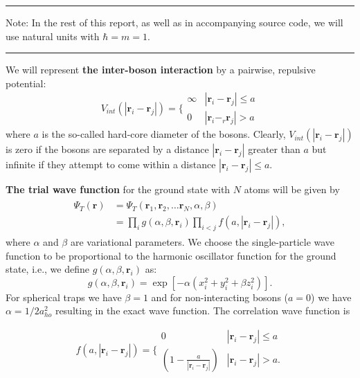 \documentclass[a4paper, 11pt]{article}
\begin{document}
\begin{multicols}{2}
\vspace{0.3cm}\hrule\vspace{0.2cm}
Note: In the rest of this report, as well as in accompanying source code, we
will use natural units with $\hbar = m = 1$.
\vspace{0.2cm}\hrule\vspace{0.3cm}

We will represent \textbf{the inter-boson interaction} by a pairwise,
repulsive potential:
\begin{equation}
    V_{int}(|\mathbf{r}_i-\mathbf{r}_j|) =  \Bigg\{
        \begin{array}{ll}
            \infty & {|\mathbf{r}_i-\mathbf{r}_j|} \leq {a}\\
            0 & {|\mathbf{r}_i-_r\mathbf{r}_j|} > {a}
        \end{array}
\end{equation}
where $a$ is the so-called hard-core diameter of the bosons.
Clearly, $V_{int}(|\mathbf{r}_i-\mathbf{r}_j|)$ is zero if the bosons are
separated by a distance $|\mathbf{r}_i-\mathbf{r}_j|$ greater than $a$ but
infinite if they attempt to come within a distance $|\mathbf{r}_i-\mathbf{r}_j| \leq a$.

\textbf{The trial wave function} for the ground state with $N$ atoms will be given by
\begin{align}
    \begin{split}
    \Psi_T(\mathbf{r})&=\Psi_T(\mathbf{r}_1, \mathbf{r}_2, \dots
    \mathbf{r}_N,\alpha,\beta)\\
    &=\prod_i g(\alpha,\beta,\mathbf{r}_i)\prod_{i<j}f(a,|\mathbf{r}_i-\mathbf{r}_j|),
    \end{split}
    \label{eq:trialwf}
\end{align}
where $\alpha$ and $\beta$ are variational parameters. We choose the
single-particle wave function to be proportional to the harmonic
oscillator function for the ground state, i.e., we define $g(\alpha,\beta,\mathbf{r}_i)$ as:
\begin{equation}
    g(\alpha,\beta,\mathbf{r}_i)= \exp[-\alpha(x_i^2+y_i^2+\beta z_i^2)].
\end{equation}
For spherical traps we have $\beta = 1$ and for non-interacting
bosons ($a=0$) we have $\alpha = 1/2a_{ho}^2$ resulting in the exact wave
function. The correlation wave function is

\begin{equation}
    f(a,|\mathbf{r}_i-\mathbf{r}_j|)=\Bigg\{
        \begin{array}{ll}
            0 & {|\mathbf{r}_i-\mathbf{r}_j|} \leq {a}\\
            (1-\frac{a}{|\mathbf{r}_i-\mathbf{r}_j|}) & {|\mathbf{r}_i-\mathbf{r}_j|} > {a}.
        \end{array}
\end{equation}


\end{multicols}
\end{document}
